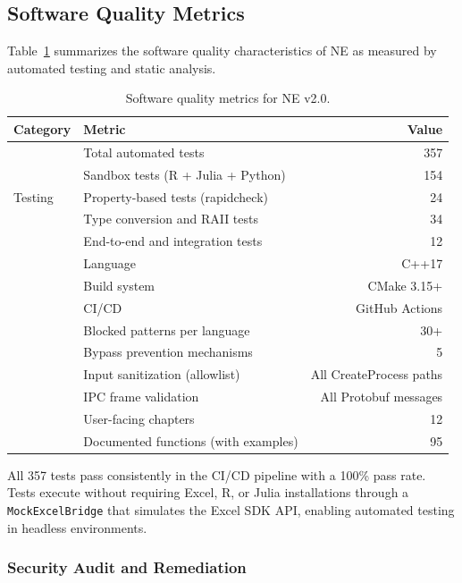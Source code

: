 \documentclass[preprint,12pt,authoryear]{elsarticle}
\newcommand{\neven}{NE\raisebox{0.2ex}{v}\rotatebox[origin=c]{180}{E}\rotatebox[origin=c]{180}{N}}
\begin{document}
\subsection{Software Quality Metrics}

Table~\ref{tab:quality} summarizes the software quality characteristics of \neven{} as measured by automated testing and static analysis.

\begin{table}[htbp]
\centering
\caption{Software quality metrics for \neven{} v2.0.}
\label{tab:quality}
\begin{tabular}{@{}llr@{}}
\toprule
\textbf{Category} & \textbf{Metric} & \textbf{Value} \\
\midrule
\multirow{5}{*}{Testing} & Total automated tests & 357 \\
 & Sandbox tests (R + Julia + Python) & 154 \\
 & Property-based tests (rapidcheck) & 24 \\
 & Type conversion and RAII tests & 34 \\
 & End-to-end and integration tests & 12 \\
\addlinespace
\multirow{3}{*}{Code quality} & Language & C++17 \\
 & Build system & CMake 3.15+ \\
 & CI/CD & GitHub Actions \\
\addlinespace
\multirow{4}{*}{Security} & Blocked patterns per language & 30+ \\
 & Bypass prevention mechanisms & 5 \\
 & Input sanitization (allowlist) & All CreateProcess paths \\
 & IPC frame validation & All Protobuf messages \\
\addlinespace
\multirow{2}{*}{Documentation} & User-facing chapters & 12 \\
 & Documented functions (with examples) & 95 \\
\bottomrule
\end{tabular}
\end{table}

All 357 tests pass consistently in the CI/CD pipeline with a 100\% pass rate. Tests execute without requiring Excel, R, or Julia installations through a \texttt{MockExcelBridge} that simulates the Excel SDK API, enabling automated testing in headless environments.

\subsubsection{Security Audit and Remediation}
\end{document}
